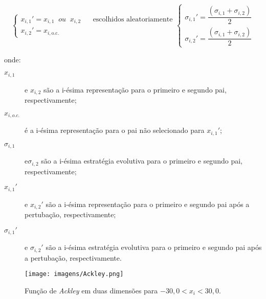 \begin{subequations}
\begin{equation}\label{eq:rec_discreta}
\left\{\begin{array}{l}
x_{i,1}' = x_{i,1} \;\; \textit{ou} \;\; x_{i,2} \;\;\;\;\;\; \text{escolhidos
aleatoriamente}\\
x_{i,2}' = x_{i,\text{o.c.}}
\end{array}\right.
\end{equation}
\begin{equation}\label{eq:rec_intermediaria}
\left\{\begin{array}{l}
\sigma_{i,1}' = \dfrac{(\sigma_{i,1}+\sigma_{i,2})}{2} \\
\sigma_{i,2}' = \dfrac{(\sigma_{i,1}+\sigma_{i,2})}{2}
\end{array}\right.
\end{equation}
\end{subequations}

\noindent onde:

\begin{description}
\item[$x_{i,1}$] e $x_{i,2}$ são a i-ésima representação para o
primeiro e segundo pai, respectivamente; 
\item[$x_{i,o.c.}$] é a i-ésima representação para o pai não
selecionado para $x_{i,1}'$;
\item[$\sigma_{i,1}$] e$\sigma_{i,2}$ são a i-ésima estratégia
evolutiva para o primeiro e segundo pai, respectivamente;
\item[$x_{i,1}'$] e $x_{i,2}'$ são a i-ésima representação para o
primeiro e segundo pai após a pertubação, respectivamente; 
\item[$\sigma_{i,1}'$] e $\sigma_{i,2}'$ são a i-ésima estratégia
evolutiva para o primeiro e segundo pai após a pertubação,
respectivamente.
\end{description}

\begin{figure}[h!t]
\centering
\texttt{[image: imagens/Ackley.png]}
\caption{Função de \emph{Ackley} em duas dimensões para $-30,0< x_i <
30,0$.}
\label{fig:funcao_ackley}
\end{figure}

